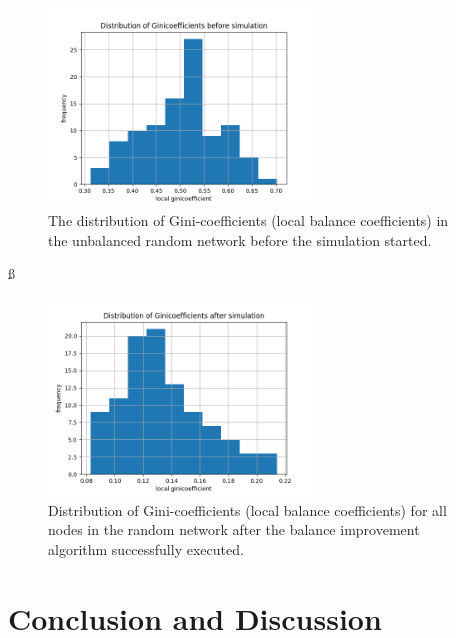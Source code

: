 \documentclass[a4paper]{paper}
\begin{document}
\begin{figure}
 \centering
 \includegraphics[width=7cm]{code/results/routabilityTest/1574847007_ginicoefficients_start.png}
 \caption{The distribution of Gini-coefficients (local balance coefficients) in the unbalanced random network before the simulation started.}
 \label{fig:giniStart}
\end{figure}ß
\begin{figure}
 \centering
 \includegraphics[width=7cm]{code/results/routabilityTest/1574847007_ginicoefficients_end.png}
 \caption{Distribution of Gini-coefficients (local balance coefficients) for all nodes in the random network after the balance improvement algorithm successfully executed.}
 \label{fig:giniEnd}
\end{figure}






\section{Conclusion and Discussion}
\label{sec:conclusion}
\end{document}
